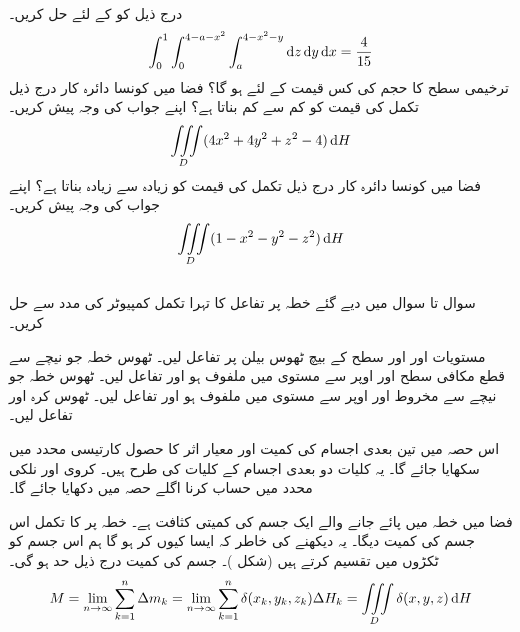 \\
درج ذیل کو  کے لئے حل کریں۔
\begin{align*}
\int_0^1\int_0^{4-a-x^2}\int_a^{4-x^2-y}\dif z\dif y\dif x=\frac{4}{15}
\end{align*}
ترخیمی سطح  کا حجم   کی کس قیمت کے لئے  ہو گا؟
فضا میں  کونسا دائرہ کار  درج ذیل تکمل کی قیمت کو کم سے کم بناتا ہے؟ اپنے جواب کی وجہ پیش کریں۔
\begin{align*}
\iiint\limits_D (4x^2+4y^2+z^2-4)\dif H
\end{align*}
فضا میں کونسا دائرہ کار  درج ذیل تکمل کی قیمت کو زیادہ سے زیادہ بناتا ہے؟ اپنے جواب کی وجہ پیش کریں۔
\begin{align*}
\iiint\limits_D (1-x^2-y^2-z^2)\dif H
\end{align*}
\\
سوال  تا سوال  میں دیے گئے خطہ پر  تفاعل کا تہرا تکمل کمپیوٹر کی مدد سے حل کریں۔

مستویات  اور   اور سطح  کے بیچ ٹھوس بیلن پر تفاعل   لیں۔
ٹھوس خطہ جو نیچے سے   قطع مکافی سطح   اور اوپر سے مستوی   میں ملفوف ہو اور تفاعل  لیں۔
ٹھوس خطہ جو نیچے سے مخروط  اور اوپر سے مستوی  میں ملفوف ہو  اور تفاعل لیں۔ 
ٹھوس کرہ   اور تفاعل  لیں۔

اس حصہ میں تین بعدی اجسام کی  کمیت اور معیار اثر کا حصول کارتیسی محدد میں سکھایا جائے گا۔ یہ کلیات دو بعدی  اجسام کے کلیات کی طرح ہیں۔ کروی اور نلکی محدد میں حساب کرنا  اگلے حصہ میں دکھایا جائے گا۔

فضا میں خطہ  میں پائے جانے والے ایک جسم کی  کمیتی کثافت  ہے۔ خطہ  پر  کا تکمل اس جسم کی کمیت دیگا۔ یہ دیکھنے کی خاطر کہ ایسا کیوں  کر ہو گا  ہم  اس جسم کو  ٹکڑوں  میں تقسیم کرتے ہیں (شکل )۔ جسم کی کمیت درج ذیل حد ہو گی۔
\begin{align}\label{مساوات_بالکثرت_تین_بعدی_کمیت}
M=\lim_{n\to\infty}\sum_{k=1}^{n}\Delta m_k=\lim_{n\to\infty}\sum_{k=1}^{n}\delta(x_k,y_k,z_k)\Delta H_k=\iiint\limits_D \delta(x,y,z) \dif H
\end{align}

